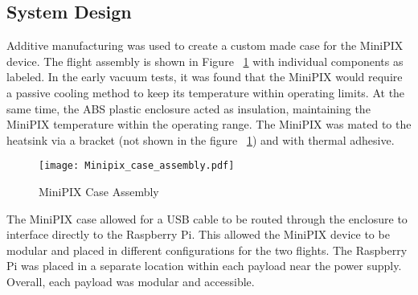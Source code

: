 \subsection{System Design}
Additive manufacturing was used to create a custom made case for the MiniPIX device.  The flight assembly is shown in Figure ~\ref{fig:minipix_case} with individual components as labeled.  In the early vacuum tests, it was found that the MiniPIX would require a passive cooling method to keep its temperature within operating limits.  At the same time, the ABS plastic enclosure acted as insulation, maintaining the MiniPIX temperature within the operating range.  The MiniPIX was mated to the heatsink via a bracket (not shown in the figure ~\ref{fig:minipix_case}) and with thermal adhesive.
\begin{figure}[H]
    \centering
    \texttt{[image: Minipix\_case\_assembly.pdf]} %
    \caption{MiniPIX Case Assembly}
    \label{fig:minipix_case}
\end{figure}
The MiniPIX case allowed for a USB cable to be routed through the enclosure to interface directly to the Raspberry Pi.  This allowed the MiniPIX device to be modular and placed in different configurations for the two flights.  The Raspberry Pi was placed in a separate location within each payload near the power supply.  Overall, each payload was modular and accessible.



